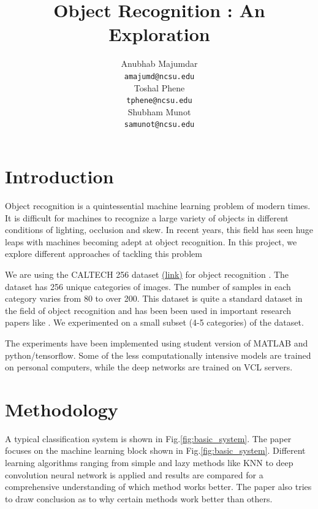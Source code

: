 \documentclass{article} %
\title{Object Recognition : An Exploration }
\author{
Anubhab Majumdar \\
\texttt{amajumd@ncsu.edu} \\
\And
Toshal Phene \\
\texttt{tphene@ncsu.edu} \\
\AND
Shubham Munot \\
\texttt{samunot@ncsu.edu} \\
}
\begin{document}
\maketitle


\section{Introduction}
Object recognition is a quintessential machine learning problem of modern times. It is difficult for machines to recognize a large variety of objects in different conditions of lighting, occlusion and skew. In recent years, this field has seen huge leaps with machines becoming adept at object recognition. In this project, we explore different approaches of tackling this problem

\par We are using the CALTECH 256 dataset \href{http://www.vision.caltech.edu/Image_Datasets/Caltech256/}{(link)} for object recognition \cite{caltech_dataset_paper}. The dataset has 256 unique categories of images. The number of samples in each category varies from 80 to over 200. This dataset is quite a standard dataset in the field of object recognition and has been been used in important research papers like \cite{knn_svm_paper}. We experimented on a small subset (4-5 categories) of the dataset. 

\par The experiments have been implemented using student version of MATLAB and python/tensorflow. Some of the less computationally intensive models are trained on personal computers, while the deep networks are trained on VCL servers.


\section{Methodology}

A typical classification system is shown in Fig.\ref{fig:basic_system}. The paper focuses on the machine learning block shown in Fig.\ref{fig:basic_system}. Different learning algorithms ranging from simple and lazy methods like KNN to deep convolution neural network is applied and results are compared for a comprehensive understanding of which method works better. The paper also tries to draw conclusion as to why certain methods work better than others. 
\end{document}

